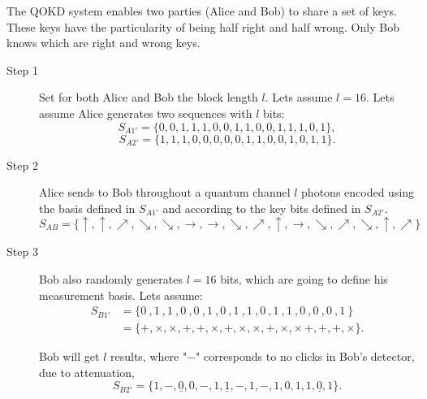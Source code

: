 

\large
The QOKD system enables two parties (Alice and Bob) to share a set of keys. These keys have the particularity of being half right and half wrong. Only Bob knows which are right and wrong keys.

\begin{description}
  \item[Step 1] Set for both Alice and Bob the block length $l$. Lets assume $l=16$. Lets assume Alice generates two sequences with $l$ bits:
      $$S_{A1'} = \{0,0,1,1,1,0,0,1,1,0,0,1,1,1,0,1 \},$$
      $$S_{A2'} = \{1,1,1,0,0,0,0,0,1,1,0,0,1,0,1,1 \}.$$

\end{description}


\large
\vspace*{0mm}
\begin{description}
  \item[Step 2] Alice sends to Bob throughout a quantum channel $l$ photons encoded using the basis defined in $S_{A1'}$ and according to the key bits defined in $S_{A2'}$.
  $$S_{AB} = \{ \uparrow,\uparrow,\nearrow,\searrow,\searrow, \to , \to, \searrow ,\nearrow ,\uparrow ,\to,\searrow,\nearrow,\searrow ,\uparrow ,\nearrow\} $$

  \item[Step 3] Bob also randomly generates $l=16$ bits, which are going to define his measurement basis. Lets assume:
  \begin{align*}
             S_{B1'} & = \{0 \ ,1 \ ,1 \ ,0 \ ,0 \ ,1 \ ,0 \ ,1 \ ,1 \ ,0 \ ,1 \ ,1 \ ,0 \ ,0 \ ,0 \ ,1 \  \} \\
                    & = \{ +,\times,\times,+,+,\times,+,\times, \times,+, \times, \times \,+,+,+,\times \}.
  \end{align*}

   Bob will get $l$ results, where "$-$"\space{ } corresponds to no clicks in Bob's detector, due to attenuation,
      $$S_{B2'} = \{1,-,\underline{0},0,-,1,\underline{1},-,1,-,1,0,1,1,\underline{0},1 \}.$$

\end{description}




